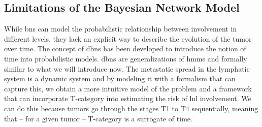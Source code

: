 \documentclass[\relativeRoot/main.tex]{subfiles}
\begin{document}
\subsection*{Limitations of the Bayesian Network Model}
\label{subsec:previous_work:limitations}

While \glspl{bn} can model the probabilistic relationship between involvement in different levels, they lack an explicit way to describe the evolution of the tumor over time. The concept of \glspl{dbn} has been developed to introduce the notion of time into probabilistic models. \Glspl{dbn} are generalizations of \glspl{hmm} and formally similar to what we will introduce now. The metastatic spread in the lymphatic system is a dynamic system and by modeling it with a formalism that can capture this, we obtain a more intuitive model of the problem and a framework that can incorporate T-category into estimating the risk of \gls{lnl} involvement. We can do this because tumors go through the stages T1 to T4 sequentially, meaning that -- for a given tumor -- T-category is a surrogate of time.
\end{document}
